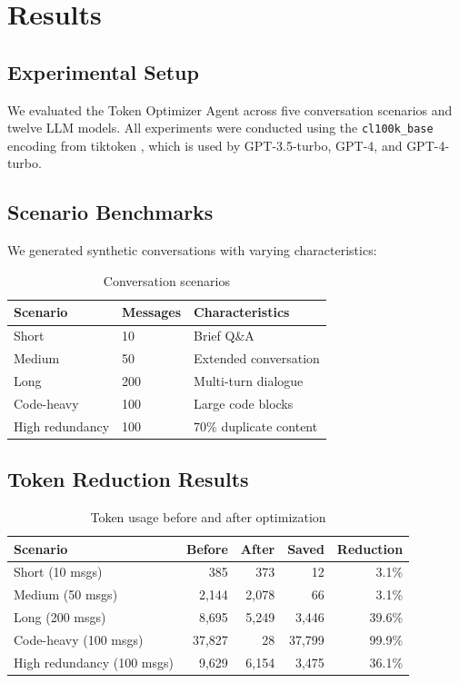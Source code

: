 \section{Results}
\label{sec:results}

\subsection{Experimental Setup}

We evaluated the Token Optimizer Agent across five conversation scenarios and twelve LLM models. All experiments were conducted using the \texttt{cl100k\_base} encoding from tiktoken \cite{tiktoken}, which is used by GPT-3.5-turbo, GPT-4, and GPT-4-turbo.

\subsection{Scenario Benchmarks}

We generated synthetic conversations with varying characteristics:

\begin{table}[H]
\centering
\caption{Conversation scenarios}
\label{tab:scenarios}
\begin{tabular}{@{}lll@{}}
\toprule
\textbf{Scenario} & \textbf{Messages} & \textbf{Characteristics} \\
\midrule
Short & 10 & Brief Q\&A \\
Medium & 50 & Extended conversation \\
Long & 200 & Multi-turn dialogue \\
Code-heavy & 100 & Large code blocks \\
High redundancy & 100 & 70\% duplicate content \\
\bottomrule
\end{tabular}
\end{table}

\subsection{Token Reduction Results}

\begin{table}[H]
\centering
\caption{Token usage before and after optimization}
\label{tab:results}
\begin{tabular}{@{}lrrrr@{}}
\toprule
\textbf{Scenario} & \textbf{Before} & \textbf{After} & \textbf{Saved} & \textbf{Reduction} \\
\midrule
Short (10 msgs) & 385 & 373 & 12 & 3.1\% \\
Medium (50 msgs) & 2,144 & 2,078 & 66 & 3.1\% \\
Long (200 msgs) & 8,695 & 5,249 & 3,446 & 39.6\% \\
Code-heavy (100 msgs) & 37,827 & 28 & 37,799 & 99.9\% \\
High redundancy (100 msgs) & 9,629 & 6,154 & 3,475 & 36.1\% \\
\bottomrule
\end{tabular}
\end{table}

